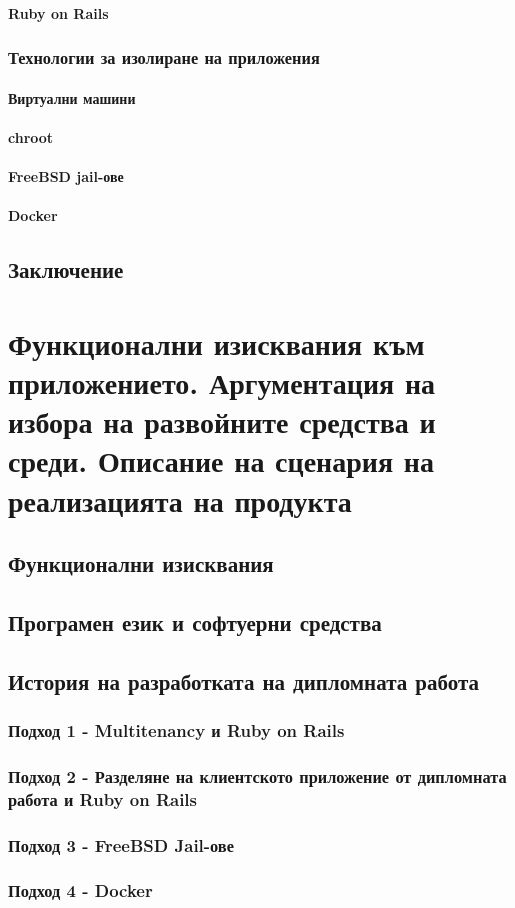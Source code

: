 \documentclass[pdftex,12pt,a4paper]{report}
\begin{document}
\subsubsection {Ruby on Rails}
\subsection {Технологии за изолиране на приложения}
\subsubsection {Виртуални машини}
\subsubsection {chroot}
\subsubsection {FreeBSD jail-ове}
\subsubsection {Docker}
\section {Заключение}
\chapter {Функционални изисквания към приложението. Аргументация на избора на развойните средства и среди. Описание на сценария на реализацията на продукта}
\section {Функционални изисквания}
\section {Програмен език и софтуерни средства}
\section {История на разработката на дипломната работа}
\subsection {Подход 1 - Multitenancy и Ruby on Rails}
\subsection {Подход 2 - Разделяне на клиентското приложение от дипломната работа и Ruby on Rails}
\subsection {Подход 3 - FreeBSD Jail-ове}
\subsection {Подход 4 - Docker}
%
%
\end{document}
